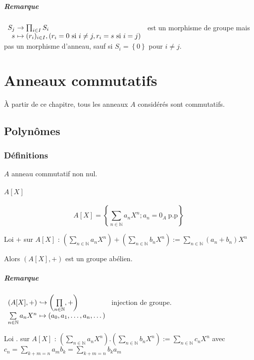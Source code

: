 \documentclass[reqno,a4paper,10pt]{report}
\newcommand{\set}[1]{\left\lbrace #1 \right\rbrace} %
\newcommand{\IN}{\ensuremath{\mathbb{N}}\xspace} %
\newcommand{\inj}{\hookrightarrow}
\begin{document}
\paragraph{Remarque}
$\begin{array}[t]{r@{\ }l}
  S_j &\to \prod_{i\in I} S_i\\
  s &\mapsto (r_i)_{i \in I}, (r_i = 0 \text{ si } i\neq j, r_i=s
  \text{ si } i=j)
\end{array}$ est un morphisme de groupe mais pas un morphisme d'anneau, sauf
si $S_i=\set{0}$ pour $i\neq j$.

\chapter{Anneaux commutatifs}
À partir de ce chapitre, tous les anneaux $A$ considérés sont commutatifs.

\section{Polynômes}
\subsection{Définitions}
$A$ anneau commutatif non nul.
\subsubsection{$A[X]$}
\[A[X] = \set{\sum_{n \in \IN} a_n X^n; a_n = 0_A \ \text{p.p}}\]

Loi $+$ sur $A[X]$ : $\displaystyle \left( \sum_{n \in \IN} a_n X^n \right) +
\left( \sum_{n \in \IN} b_n X^n \right) := \sum_{n \in \IN} (a_n + b_n) X^n$

Alors $(A[X], +)$ est un groupe abélien.
\paragraph{Remarque}
$\begin{array}[t]{r@{\ }l}
  (A[X], + ) &\inj \left(\prod\limits_{n \in \IN}, +\right)\\
  \sum\limits_{n\in \IN} a_n X^n &\mapsto (a_0, a_1, \dots, a_n, \dots)
\end{array}$ injection de groupe.

Loi $.$ sur $A[X]$ : $\displaystyle \left( \sum_{n \in \IN} a_n X^n \right) .
\left( \sum_{n\in \IN} b_n X^n \right) := \sum_{n \in \IN} c_n X^n$ avec
$\displaystyle c_n = \sum_{k+m = n} a_m b_k =\sum_{k+m = n} b_k a_m$
\end{document}

